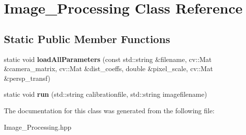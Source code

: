 \hypertarget{class_image___processing}{}\section{Image\+\_\+\+Processing Class Reference}
\label{class_image___processing}
\subsection*{Static Public Member Functions}
\begin{DoxyCompactItemize}
\item 
\mbox{\label{class_image___processing_ae17b6983ca36039307152613b5738092}} 
static void {\bfseries load\+All\+Parameters} (const std\+::string \&filename, cv\+::\+Mat \&camera\+\_\+matrix, cv\+::\+Mat \&dist\+\_\+coeffs, double \&pixel\+\_\+scale, cv\+::\+Mat \&persp\+\_\+transf)
\item 
\mbox{\label{class_image___processing_a98e9ad2bde38dec6963a7082ae4e0d81}} 
static void {\bfseries run} (std\+::string calibrationfile, std\+::string imagefilename)
\end{DoxyCompactItemize}


The documentation for this class was generated from the following file\+:\begin{DoxyCompactItemize}
\item 
Image\+\_\+\+Processing.\+hpp\end{DoxyCompactItemize}
